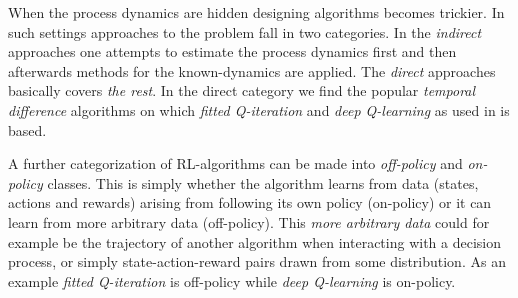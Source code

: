 When the process dynamics are hidden designing algorithms becomes trickier.
In such settings approaches to the problem
fall in two categories. In the \emph{indirect} approaches
one attempts to estimate the process dynamics first and then afterwards
methods for the known-dynamics are applied.
The \emph{direct} approaches basically covers \emph{the rest}.
In the direct category we find the popular \emph{temporal difference}
algorithms on which \emph{fitted Q-iteration}
and \emph{deep Q-learning} as used in  is based.

A further categorization of RL-algorithms can be made into
\emph{off-policy} and \emph{on-policy} classes.
This is simply whether the algorithm learns from data
(states, actions and rewards) arising from 
following its own policy (on-policy) or it can learn from more
arbitrary data (off-policy).
This \emph{more arbitrary data} could for example be
the trajectory of another algorithm when interacting with a decision process,
or simply state-action-reward pairs drawn from some distribution.
As an example \emph{fitted Q-iteration} is off-policy while
\emph{deep Q-learning} is on-policy.

